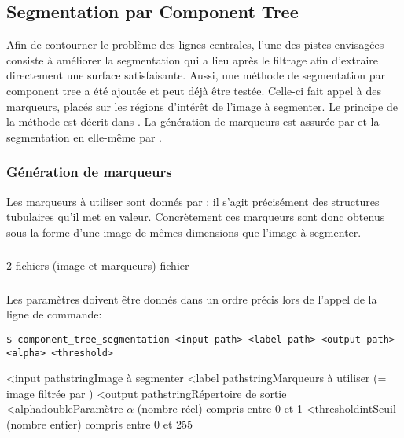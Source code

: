 	\subsection{Segmentation par Component Tree}

Afin de contourner le problème des lignes centrales, l'une des pistes envisagées consiste à améliorer la segmentation qui a lieu après le filtrage afin d'extraire directement une surface satisfaisante. Aussi, une méthode de segmentation par component tree a été ajoutée et peut déjà être testée. Celle-ci fait appel à des marqueurs, placés sur les régions d'intérêt de l'image à segmenter. Le principe de la méthode est décrit dans \cite{Passat2011}. La génération de marqueurs est assurée par \rorpo et la segmentation en elle-même par \cts.

	\subsubsection{Génération de marqueurs}

Les marqueurs à utiliser sont donnés par \rorpo: il s'agit précisément des structures tubulaires qu'il met en valeur. Concrètement ces marqueurs sont donc obtenus sous la forme d'une image de mêmes dimensions que l'image à segmenter.

	\subsubsection{\ioT}
	
\iolist
{2 fichiers \nii (image et marqueurs)}
{fichier \nii}

	
	\subsubsection{\argsT}

Les paramètres doivent être donnés dans un ordre précis lors de l'appel de la ligne de commande:

\begin{lstlisting}
$ component_tree_segmentation <input path> <label path> <output path> <alpha> <threshold>
\end{lstlisting}

\args
{<input path}{}{string}{Image à segmenter}
{<label path}{}{string}{Marqueurs à utiliser (= image filtrée par \rorpo)}
{<output path}{}{string}{Répertoire de sortie}
{<alpha}{}{double}{Paramètre $\alpha$ (nombre réel) compris entre 0 et 1}
{<threshold}{}{int}{Seuil (nombre entier) compris entre 0 et 255}
\stoparg

	\subsubsection{\etatg}
	

